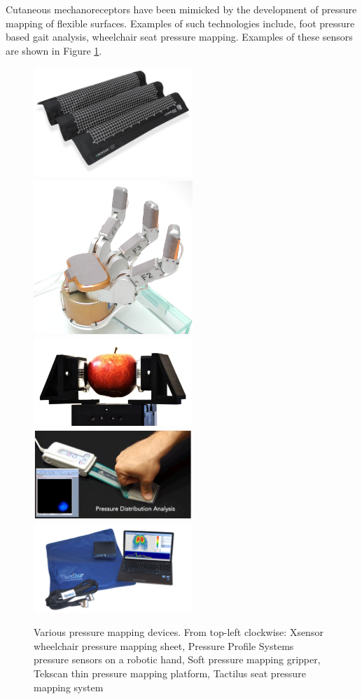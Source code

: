 Cutaneous mechanoreceptors have been mimicked by the development of pressure mapping of flexible surfaces. Examples of such technologies include, foot pressure based gait analysis, wheelchair seat pressure mapping. Examples of these sensors are shown in Figure \ref{fig:mechano-tech}.
\begin{figure}[H]
    \centering
    \includegraphics[width=6cm]{Figures/xsensor.png}
    \includegraphics[width=6cm]{Figures/Robotic+arm+with+PPS+sensors.png}
    \includegraphics[width=6cm]{Figures/powerOn_gripper_apple.jpg}
    \includegraphics[width=6cm]{Figures/tekscan-pressure-sensor.jpg}
    \includegraphics[width=6cm]{Figures/tactilus-pressuremap-sensor-laptop.jpg}
    \caption{Various pressure mapping devices. From top-left clockwise: Xsensor wheelchair pressure mapping sheet\cite{Xsensor}, Pressure Profile Systems pressure sensors on a robotic hand\cite{PressureProfile2023}, Soft pressure mapping gripper\cite{PowerOn}, Tekscan thin pressure mapping platform\cite{Tekscan}, Tactilus seat pressure mapping system\cite{SensorProducts}}
    \label{fig:mechano-tech}
\end{figure}
